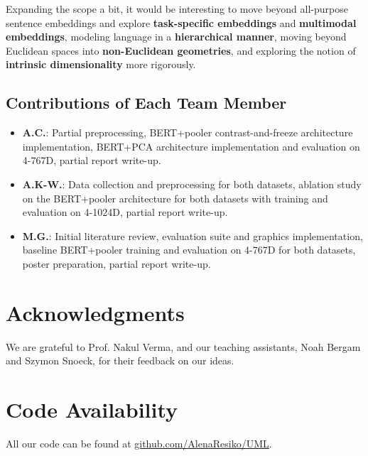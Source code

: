 \documentclass{article}
\begin{document}
Expanding the scope a bit, it would be interesting to move beyond all-purpose sentence embeddings and explore
\textbf{task-specific embeddings} and \textbf{multimodal embeddings}, modeling language in a
\textbf{hierarchical manner}, moving beyond Euclidean spaces into \textbf{non-Euclidean geometries}, and
exploring the notion of \textbf{intrinsic dimensionality} more rigorously.

\subsection{Contributions of Each Team Member}
\begin{itemize}
\item \textbf{A.C.}: Partial preprocessing, BERT+pooler contrast-and-freeze architecture implementation,
BERT+PCA architecture implementation and evaluation on 4-767D, partial report write-up.
\item \textbf{A.K-W.}: Data collection and preprocessing for both datasets, ablation
study on the BERT+pooler architecture for both datasets with training and evaluation on
4-1024D, partial report write-up.
\item \textbf{M.G.}: Initial literature review, evaluation suite and graphics
implementation, baseline BERT+pooler training and evaluation on 4-767D for both datasets,
poster preparation, partial report write-up.
\end{itemize}

\section*{Acknowledgments}
We are grateful to Prof. Nakul Verma, and our teaching assistants, Noah Bergam and Szymon
Snoeck, for their feedback on our ideas.

\section*{Code Availability}
All our code can be found at \href{https://github.com/AlenaResiko/UML}{github.com/AlenaResiko/UML}.




\raggedbottom
\end{document}
